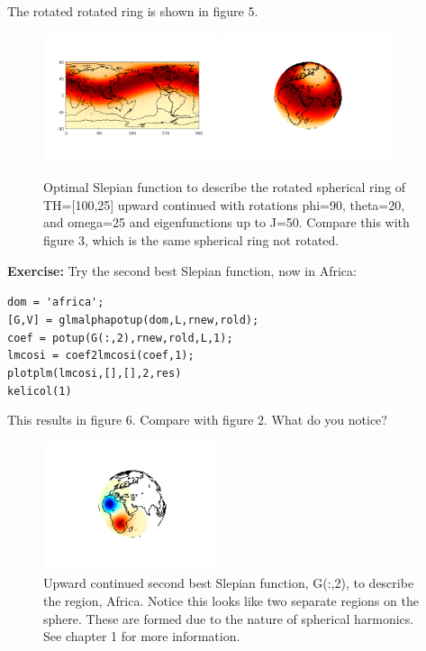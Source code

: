 \documentclass[11pt]{article}
\begin{document}
The rotated rotated ring is shown in figure 5.

\begin{figure}[H]
  \centering
  \includegraphics[width=0.45\textwidth]{figures/rot100_25flat.png}
  \includegraphics[width=0.45\textwidth]{figures/rot100_25.png}
  \caption{Optimal Slepian function to describe the rotated spherical ring of TH=[100,25] upward continued with rotations phi=90, theta=20, and omega=25 and eigenfunctions up to J=50.  Compare this with figure 3, which is the same spherical ring not rotated.}
\label{Grot10025}
\end{figure}

\textbf{Exercise:} Try the second best Slepian function, now in Africa:

\verb+dom = 'africa';+\\
\verb+[G,V] = glmalphapotup(dom,L,rnew,rold);+\\
\verb+coef = potup(G(:,2),rnew,rold,L,1);+\\
\verb+lmcosi = coef2lmcosi(coef,1);+\\
\verb+plotplm(lmcosi,[],[],2,res)+\\
\verb+kelicol(1)+

This results in figure 6.  Compare with figure 2.  What do you notice?

\begin{figure}[H]
  \centering
  \includegraphics[width=0.45\textwidth]{figures/G_2_ml.png}
  \caption{Upward continued second best Slepian function, G(:,2), to describe the region, Africa.  Notice this looks like two separate regions on the sphere.  These are formed due to the nature of spherical harmonics.  See chapter 1 for more information.}
\label{G(:,2)}
\end{figure}
\end{document}

